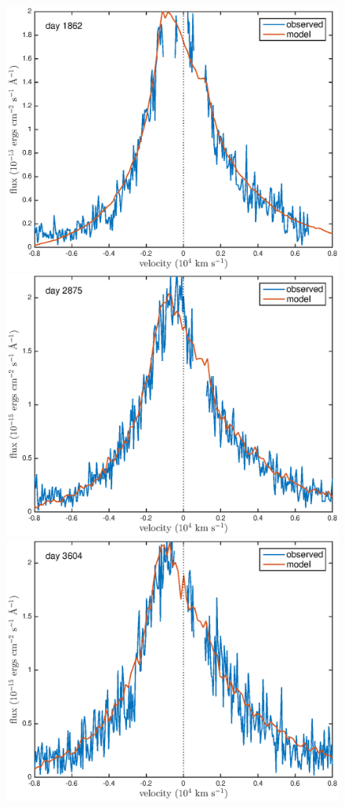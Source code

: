 \documentclass[useAMS,usenatbib,usegraphicx]{mnras}
\begin{document}
\begin{figure}

\includegraphics[trim =33 10 45 15,clip=true,scale=0.35]{clump_1/maximum/d1862Ha}
\includegraphics[trim =55 10 45 15,clip=true,scale=0.35]{clump_1/maximum/d2875Ha}
\includegraphics[trim =55 10 45 15,clip=true,scale=0.35]{clump_1/maximum/d3604Ha}

\end{figure}
\end{document}

